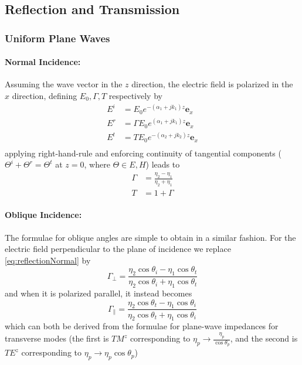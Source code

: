 \documentclass{article}
\numberwithin{equation}{section}
\begin{document}
\subsection{Reflection and Transmission}
\subsubsection*{Uniform Plane Waves}
\paragraph*{Normal Incidence:}

Assuming the wave vector in the $z$ direction, the electric field is polarized in the $x$ direction, defining $E_0, \Gamma, T$ respectively by
\begin{subequations} 
    \begin{align*}
        E^i &= E_0 e^{-(\alpha_1 + jk_1) z} \mathbf{e}_x \\
        E^r &= \Gamma E_0 e^{(\alpha_1 + jk_1)z} \mathbf{e}_x \\
        E^t &= T E_0 e^{-(\alpha_2 + jk_2) z} \mathbf{e}_x \\
    \end{align*}
\end{subequations}
applying right-hand-rule and enforcing continuity of tangential components ($\Theta^i + \Theta^r = \Theta^t$ at $z=0$, where $\Theta \in {E,H}$) leads to 
\begin{subequations} \label{eq:losslessNormalReflection}
    \begin{align}
        \Gamma &= \frac{\eta_2 - \eta_1}{\eta_2 + \eta_1} \label{eq:reflectionNormal} \\
        T &= 1 + \Gamma
    \end{align}
\end{subequations}
\paragraph*{Oblique Incidence:}

The formulae for oblique angles are simple to obtain in a similar fashion. For the electric field perpendicular to the plane of incidence we replace \eqref{eq:reflectionNormal} by
\begin{equation} \label{eq:reflectionObliquePerp}
    \Gamma_{\perp} = \frac{\eta_2 \cos \theta_i - \eta_1 \cos \theta_t }{\eta_2 \cos \theta_i + \eta_1 \cos \theta_t}
\end{equation}
and when it is polarized parallel, it instead becomes
\begin{equation} \label{eq:reflectionObliquePar}
    \Gamma_{\parallel} = \frac{\eta_2 \cos \theta_t - \eta_1 \cos \theta_i }{\eta_2 \cos \theta_t + \eta_1 \cos \theta_i}
\end{equation}
which can both be derived from the formulae for plane-wave impedances for transverse modes (the first is $TM^z$ corresponding to $\eta_p \to \frac{\eta_p}{\cos \theta_p}$, and the second is $TE^z$ corresponding to $\eta_p \to \eta_p \cos \theta_p $)
\newpage
\end{document}
